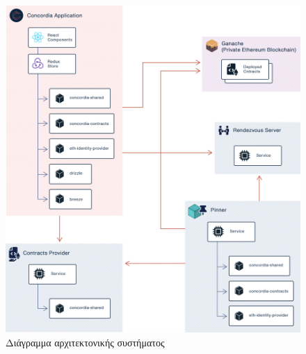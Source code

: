 \begin{figure}[H]
    \centering
    \includegraphics[width=\textwidth]{assets/figures/chapter-4/4.3.architecture-architecture-overview}
    \caption{Διάγραμμα αρχιτεκτονικής συστήματος}
    \label{figure:4-3-architecture-overview}
\end{figure}

\newpage








